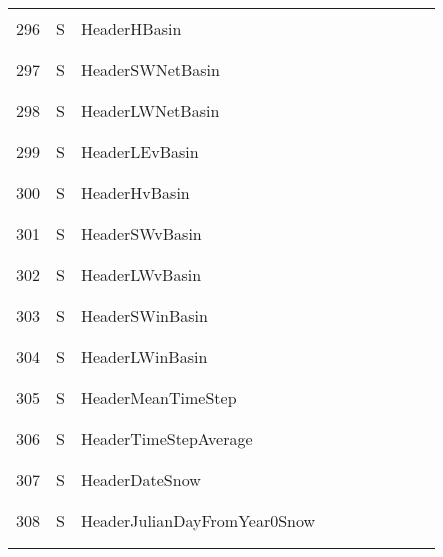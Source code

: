 \begin{longtable}{|c|c|l|c|c|c|c|p{}|c|p{}|}
&&&&&&&&&\\\hline%
&&&&&&&&&\\
296 & S & HeaderHBasin & & & & & & & \\
&&&&&&&&&\\\hline%
&&&&&&&&&\\
297 & S & HeaderSWNetBasin & & & & & & & \\
&&&&&&&&&\\\hline%
&&&&&&&&&\\
298 & S & HeaderLWNetBasin & & & & & & & \\
&&&&&&&&&\\\hline%
&&&&&&&&&\\
299 & S & HeaderLEvBasin & & & & & & & \\
&&&&&&&&&\\\hline%
&&&&&&&&&\\
300 & S & HeaderHvBasin & & & & & & & \\
&&&&&&&&&\\\hline%
&&&&&&&&&\\
301 & S & HeaderSWvBasin & & & & & & & \\
&&&&&&&&&\\\hline%
&&&&&&&&&\\
302 & S & HeaderLWvBasin & & & & & & & \\
&&&&&&&&&\\\hline%
&&&&&&&&&\\
303 & S & HeaderSWinBasin & & & & & & & \\
&&&&&&&&&\\\hline%
&&&&&&&&&\\
304 & S & HeaderLWinBasin & & & & & & & \\
&&&&&&&&&\\\hline%
&&&&&&&&&\\
305 & S & HeaderMeanTimeStep & & & & & & & \\
&&&&&&&&&\\\hline%
&&&&&&&&&\\
306 & S & HeaderTimeStepAverage & & & & & & & \\
&&&&&&&&&\\\hline%
&&&&&&&&&\\
307 & S & HeaderDateSnow & & & & & & & \\
&&&&&&&&&\\\hline%
&&&&&&&&&\\
308 & S & HeaderJulianDayFromYear0Snow & & & & & & & \\
&&&&&&&&&\\\hline%
&&&&&&&&&\\

\end{longtable}
